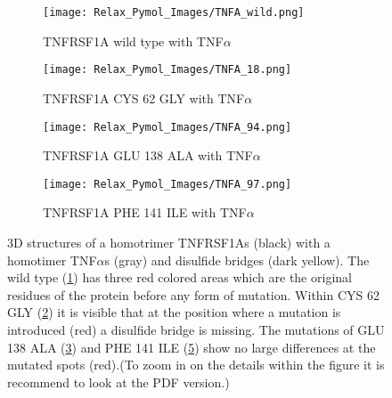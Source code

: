 	\begin{figure}[!ht]
		\centering
		\begin{subfigure}{0.49\textwidth}
			\texttt{[image: Relax\_Pymol\_Images/TNFA\_wild.png]}
			\caption{TNFRSF1A wild type with TNF$\alpha$}
			\label{fig:RES_TNFA_wild}
		\end{subfigure}
		\begin{subfigure}{0.49\textwidth}
			\texttt{[image: Relax\_Pymol\_Images/TNFA\_18.png]}
			\caption{TNFRSF1A CYS 62 GLY with TNF$\alpha$}
			\label{fig:RES_TNFA_18}
		\end{subfigure}
		\par\bigskip
		\begin{subfigure}{0.49\textwidth}
			\texttt{[image: Relax\_Pymol\_Images/TNFA\_94.png]}
			\caption{TNFRSF1A GLU 138 ALA with TNF$\alpha$}
			\label{fig:RES_TNFA_94}
		\end{subfigure}
		\begin{subfigure}{0.49\textwidth}
			\texttt{[image: Relax\_Pymol\_Images/TNFA\_97.png]}
			\caption{TNFRSF1A PHE 141 ILE with TNF$\alpha$}
			\label{fig:RES_TNFA_97}
			\end{subfigure}
		\caption[TNFRSF1A homotrimer with TNF$\alpha$ homo trimers wild type and mutated relaxed models]{3D structures of a homotrimer TNFRSF1As (black) with a homotimer TNF$\alpha$s (gray) and disulfide bridges (dark yellow). The wild type (\ref{fig:RES_TNFA_wild}) has three red colored areas which are the original residues of the protein before any form of mutation. Within CYS 62 GLY (\ref{fig:RES_TNFA_18}) it is visible that at the position where a mutation is introduced (red) a disulfide bridge is missing. The mutations of GLU 138 ALA (\ref{fig:RES_TNFA_94}) and PHE 141 ILE (\ref{fig:RES_TNFA_97}) show no large differences at the mutated spots (red).(To zoom in on the details within the figure it is recommend to look at the PDF version.)}
		\end{figure}
		\newpage
		
